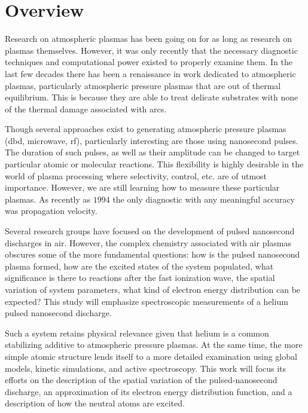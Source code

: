 \section{Overview}

Research on atmospheric plasmas has been going on for as long as research on
plasmas themselves. However, it was only recently that the necessary diagnostic
techniques and computational power existed to properly examine them. In the last
few decades there has been a renaissance in work dedicated to atmospheric
plasmas, particularly atmospheric pressure plasmas that are out of thermal
equilibrium. This is because they are able to treat delicate substrates with
none of the thermal damage associated with arcs.

Though several approaches exist to generating atmospheric pressure plasmas (dbd,
microwave, rf), particularly interesting are those using nanosecond pulses. The
duration of such pulses, as well as their amplitude can be changed to target
particular atomic or molecular reactions. This flexibility is highly desirable
in the world of plasma processing where selectivity, control, etc. are of utmost
importance. However, we are still learning how to measure these particular
plasmas. As recently as $1994$ \cite{Vasilyak1994} the only diagnostic with any
meaningful accuracy was propagation velocity. 

Several research groups have focused on the development of pulsed nanosecond
discharges in air. However, the complex chemistry associated with air plasmas
obscures some of the more fundamental questions: how is the pulsed nanosecond
plasma formed, how are the excited states of the system populated, what
significance is there to reactions after the fast ionization wave, the spatial
variation of system parameters, what kind of electron energy distribution can be
expected?  This study will emphasize
spectroscopic measurements of a helium pulsed nanosecond discharge.

Such a system retains physical relevance given that helium is a common
stabilizing additive to atmospheric pressure plasmas. At the same time, the more
simple atomic structure lends itself to a more detailed examination using global
models, kinetic simulations, and active spectroscopy. This work will focus its
efforts on the description of the spatial variation of the pulsed-nanosecond
discharge, an approximation of its electron energy distribution function, and a
description of how the neutral atoms are excited.

